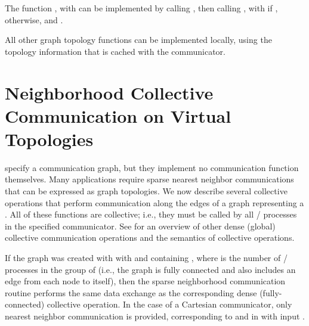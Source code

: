 \begin{implementors}
The function ,
with  can be implemented by calling
,
then calling\flushline
{}, with 
if \flushline
{}, 
otherwise, and .

All other graph topology functions can be implemented locally, using the
topology information that is cached with the communicator.
\end{implementors}

\section[Neighborhood Collective Communication]{Neighborhood Collective Communication on Virtual Topologies}
\label{sec:sparsecoll}

 specify a communication graph, but they
implement no communication function themselves. Many applications
require sparse nearest neighbor communications that can be expressed as
graph topologies. We now describe several collective operations that
perform communication along the edges of a graph representing a . All of these
functions are collective; i.e., they must be called by all \MPI/ processes in
the specified communicator. See 
for an overview
of other dense (global) collective communication operations
and the semantics of collective operations.

If the graph was created with 
with  and  containing
, where  is the number of \MPI/ processes in the group
of 
(i.e., the graph is fully connected and also includes 
an edge from each node to itself),
then the sparse neighborhood communication routine performs the same data exchange
as the corresponding dense (fully-connected) collective operation. 
In the case of a Cartesian communicator, only nearest neighbor communication
is provided, corresponding to  and 
in  with input .

